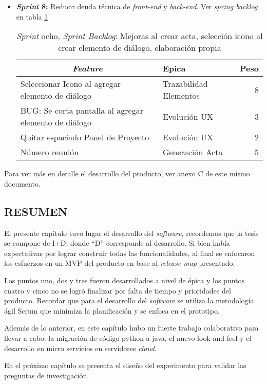 \begin{itemize}
	\item \textbf{\textit{Sprint} 8:} Reducir deuda técnica de \textit{front-end} y \textit{back-end}. Ver \textit{spring backlog} en tabla \ref{tab:backlog8}

\begin{table}[!h]
\centering
\caption{\textit{Sprint} ocho, \textit{Sprint Backlog}: Mejoras al crear acta, selección icono al crear elemento de diálogo, elaboración propia}
\label{tab:backlog8}
\begin{tabular}{|l|l|r|}
\hline
\multicolumn{1}{|c|}{\textit{\textbf{Feature}}} & \textbf{Epica} & \textbf{Peso} \\ \hline
Seleccionar Icono al agregar elemento de diálogo & Trazabilidad Elementos & 8 \\ \hline
BUG: Se corta pantalla al agregar elemento de diálogo & Evolución UX & 3 \\ \hline
Quitar espaciado Panel de Proyecto & Evolución UX & 2 \\ \hline
Número reunión & Generación Acta & 5 \\ \hline
\end{tabular}
\end{table}

\end{itemize}

Para ver más en detalle el desarrollo del producto, ver anexo C de este mismo documento.

\subsection{RESUMEN}

El presente capítulo tuvo lugar el desarrollo del \textit{software}, recordemos que la tesis se compone de I+D, donde “D” corresponde al desarrollo. Si bien había expectativas por lograr construir todas las funcionalidades, al final se enfocaron los esfuerzos en un MVP del producto en base al \textit{release map} presentado.

Los puntos uno, dos y tres fueron desarrollados a nivel de épica y los puntos cuatro y cinco no se logró finalizar por falta de tiempo y prioridades del producto. Recordar que para el desarrollo del \textit{software} se utiliza la metodología ágil Scrum que minimiza la planificación y se enfoca en el prototipo.

Además de lo anterior, en este capítulo hubo un fuerte trabajo colaborativo para llevar a cabo: la migración de código python a java, el nuevo look and feel y el desarrollo en micro servicios en servidores \textit{cloud}.

En el próximo capítulo se presenta el diseño del experimento para validar las preguntas de investigación.
